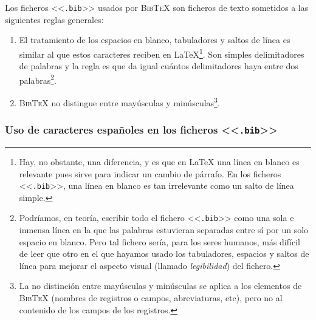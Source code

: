 \documentclass[a4paper,11pt]{article}
\def\btx-{\textsc{Bib\TeX}}
\def\ltx-{\LaTeX}
\def\ltr#1-{<<\texttt{#1}>>}
\def\tpf#1-{\ltr.#1-}
\begin{document}
Los ficheros \tpf bib- usados por  \btx- son ficheros de texto sometidos a las
siguientes reglas generales:


\begin{enumerate}

\item El tratamiento de los espacios  en blanco, tabuladores y saltos de línea
  es  similar  al  que  estos  caracteres reciben  en  \ltx-\footnote{Hay,  no
    obstante,  una diferencia,  y  es que  en  \ltx- una  línea  en blanco  es
    relevante pues sirve  para indicar un cambio de  párrafo.  En los ficheros
    \tpf bib-, una  línea en blanco es tan irrelevante como  un salto de línea
    simple.}. Son simples delimitadores de palabras y la regla es que da igual
  cuántos delimitadores haya entre dos palabras\footnote{Podríamos, en teoría,
    escribir todo el fichero \tpf bib- como una sola e inmensa línea en la que
    las palabras estuvieran separadas entre  sí por un solo espacio en blanco.
    Pero tal  fichero sería, para los  seres humanos, más difícil  de leer que
    otro en el  que hayamos usado los tabuladores, espacios  y saltos de línea
    para mejorar el aspecto visual (llamado \emph{legibilidad}) del fichero.}.

\item  \btx-  no  distingue   entre  mayúsculas  y  minúsculas\footnote{La  no
    distinción  entre mayúsculas  y minúsculas  se aplica  a los  elementos de
    \btx-  (nombres de  registros o  campos,  abreviaturas, etc),  pero no  al
    contenido de los campos de los registros.  }.

\end{enumerate}

\subsubsection*{Uso de caracteres españoles en los ficheros \tpf bib-}
\label{sec:uso-de-caracteres}
\end{document}

